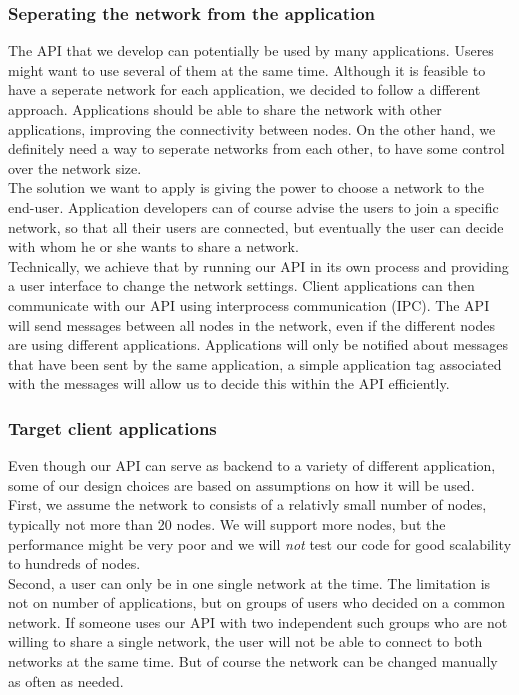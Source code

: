 \subsubsection{Seperating the network from the application}
The API that we develop can potentially be used by many applications. Useres might want to use several of them at the same time. Although it is feasible to have a seperate network for each application, we decided to follow a different approach. Applications should be able to share the network with other applications, improving the connectivity between nodes. On the other hand, we definitely need a way to seperate networks from each other, to have some control over the network size. \\
The solution we want to apply is giving the power to choose a network to the end-user. Application developers can of course advise the users to join a specific network, so that all their users are connected, but eventually the user can decide with whom he or she wants to share a network. \\
Technically, we achieve that by running our API in its own process and providing a user interface to change the network settings. Client applications can then communicate with our API using interprocess communication (IPC). The API will send messages between all nodes in the network, even if the different nodes are using different applications. Applications will only be notified about messages that have been sent by the same application, a simple application tag associated with the messages will allow us to decide this within the API efficiently. \\

\subsubsection{Target client applications}
	Even though our API can serve as backend to a variety of different application, some of our design choices are based on assumptions on how it will be used. \\
	First, we assume the network to consists of a relativly small number of nodes, typically not more than 20 nodes. We will support more nodes, but the performance might be very poor and we will \textit{not} test our code for good scalability to hundreds of nodes. \\
Second, a user can only be in one single network at the time. The limitation is not on number of applications, but on groups of users who decided on a common network. If someone uses our API with two independent such groups who are not willing to share a single network, the user will not be able to connect to both networks at the same time. But of course the network can be changed manually as often as needed.

